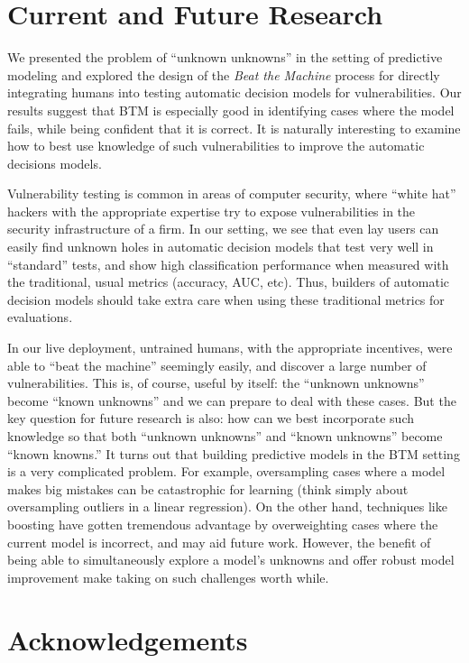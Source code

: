 \section{Current and Future Research}

We presented the problem of ``unknown unknowns'' in the setting of predictive modeling and explored the design of the \emph{Beat the Machine} process for directly integrating humans into testing automatic decision models for vulnerabilities. Our results suggest that BTM is especially good in identifying cases where the model fails, while being confident that it is correct.  It is naturally interesting to examine how to best use knowledge of such vulnerabilities to improve the automatic decisions models. 


Vulnerability testing is common in areas of computer security, where ``white hat'' hackers with the appropriate expertise try to expose vulnerabilities in the security infrastructure of a firm. In our setting, we see that even lay users can easily find unknown holes in automatic decision models that test very well in ``standard'' tests, and show high classification performance when measured with the traditional, usual metrics (accuracy, AUC, etc).  Thus, builders of automatic decision models should take extra care when using these
traditional metrics for evaluations.

In our live deployment, untrained humans, with the appropriate incentives, were able to ``beat the machine'' seemingly easily, and discover a large number of vulnerabilities. This is, of course, useful by itself: the ``unknown unknowns'' become ``known unknowns'' and we can prepare to deal with these cases. But the key question for future research is also: how can we best incorporate such knowledge so that both ``unknown unknowns'' and ``known unknowns'' become ``known knowns.'' It turns out that building predictive models in the BTM setting is a very complicated problem. For example, oversampling cases where a model makes big mistakes can be catastrophic for  learning (think simply about oversampling outliers in a linear regression). On the other hand, techniques like boosting \cite{Freund99ashort} have gotten tremendous advantage by overweighting cases where the current model is incorrect, and may aid future work. However, the benefit of being able to simultaneously explore a model's unknowns and offer robust model improvement make taking on such challenges worth while.

\section*{Acknowledgements}

